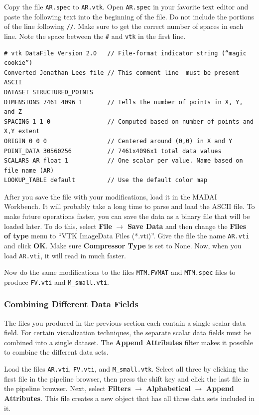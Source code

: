 \documentclass[12pt]{article}
\newcommand{\filter}[1]{\textbf{#1}}
\newcommand{\menu}[1]{\textbf{#1}}
\newcommand{\file}[1]{\texttt{#1}}
\newcommand{\setting}[1]{\textbf{#1}}
\begin{document}
Copy the file \file{AR.spec} to \file{AR.vtk}. Open \file{AR.spec} in your favorite text editor and paste the following text into the beginning of the file. Do not include the portions of the line following \verb+//+. Make sure to get the correct number of spaces in each line. Note the space between the \verb+#+ and \verb+vtk+ in the first line.

\begin{verbatim}
# vtk DataFile Version 2.0   // File-format indicator string (“magic cookie”)
Converted Jonathan Lees file // This comment line  must be present
ASCII
DATASET STRUCTURED_POINTS 
DIMENSIONS 7461 4096 1       // Tells the number of points in X, Y, and Z 
SPACING 1 1 0                // Computed based on number of points and X,Y extent
ORIGIN 0 0 0                 // Centered around (0,0) in X and Y
POINT_DATA 30560256          // 7461x4096x1 total data values
SCALARS AR float 1           // One scalar per value. Name based on file name (AR)
LOOKUP_TABLE default         // Use the default color map
\end{verbatim}

After you save the file with your modifications, load it in the MADAI Workbench. It will probably take a long time to parse and load the ASCII file. To make future operations faster, you can save the data as a binary file that will be loaded later. To do this, select \menu{File} $\rightarrow$ \menu{Save Data} and then change the \setting{Files of type} menu to ``VTK ImageData Files (*.vti)''. Give the file the name \file{AR.vti} and click \setting{OK}. Make sure \setting{Compressor Type} is set to None. Now, when you load \file{AR.vti}, it will read in much faster.

Now do the same modifications to the files \file{MTM.FVMAT} and \file{MTM.spec} files to produce \file{FV.vti} and \file{M\_small.vti}.

\subsubsection{Combining Different Data Fields}

The files you produced in the previous section each contain a single scalar data field. For certain visualization techniques, the separate scalar data fields must be combined into a single dataset. The \filter{Append Attributes} filter makes it possible to combine the different data sets.

Load the files \file{AR.vti}, \file{FV.vti}, and \file{M\_small.vtk}. Select all three by clicking the first file in the pipeline browser, then press the shift key and click the last file in the pipeline browser. Next, select \menu{Filters} $\rightarrow$ \menu{Alphabetical} $\rightarrow$ \menu{Append Attributes}. This file creates a new object that has all three data sets included in it.
\end{document}
